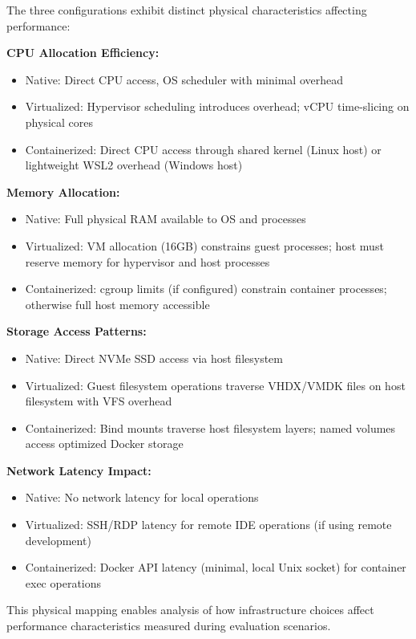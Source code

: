 The three configurations exhibit distinct physical characteristics affecting performance:

\textbf{CPU Allocation Efficiency:}
\begin{itemize}
\item Native: Direct CPU access, OS scheduler with minimal overhead
\item Virtualized: Hypervisor scheduling introduces overhead; vCPU time-slicing on physical cores
\item Containerized: Direct CPU access through shared kernel (Linux host) or lightweight WSL2 overhead (Windows host)
\end{itemize}

\textbf{Memory Allocation:}
\begin{itemize}
\item Native: Full physical RAM available to OS and processes
\item Virtualized: VM allocation (16GB) constrains guest processes; host must reserve memory for hypervisor and host processes
\item Containerized: cgroup limits (if configured) constrain container processes; otherwise full host memory accessible
\end{itemize}

\textbf{Storage Access Patterns:}
\begin{itemize}
\item Native: Direct NVMe SSD access via host filesystem
\item Virtualized: Guest filesystem operations traverse VHDX/VMDK files on host filesystem with VFS overhead
\item Containerized: Bind mounts traverse host filesystem layers; named volumes access optimized Docker storage
\end{itemize}

\textbf{Network Latency Impact:}
\begin{itemize}
\item Native: No network latency for local operations
\item Virtualized: SSH/RDP latency for remote IDE operations (if using remote development)
\item Containerized: Docker API latency (minimal, local Unix socket) for container exec operations
\end{itemize}

This physical mapping enables analysis of how infrastructure choices affect performance characteristics measured during evaluation scenarios.

